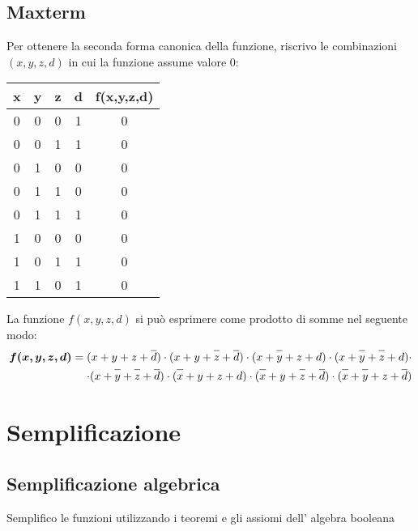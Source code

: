 \documentclass{article}
\newcommand*{\oline}[1]{\overline{#1\mathstrut}}
\newcommand{\bigspace}{\quad\quad\quad\quad}
\begin{document}
\subsection*{Maxterm}
Per ottenere la seconda forma canonica della funzione, riscrivo le combinazioni $(x,y,z,d)$ in cui la funzione assume valore $0$:
\begin{center}
	\begin{tabular}{|c|c|c|c|c|}
		\hline
		\textbf{x} & \textbf{y} & \textbf{z} & \textbf{d} & \textbf{f(x,y,z,d)} \\
		\hline
		0 & 0 & 0 & 1 & 0 \\
		\hline
		0 & 0 & 1 & 1 & 0 \\
		\hline
		0 & 1 & 0 & 0 & 0 \\
		\hline
		0 & 1 & 1 & 0 & 0 \\
		\hline
		0 & 1 & 1 & 1 & 0 \\
		\hline
		1 & 0 & 0 & 0 & 0 \\
		\hline
		1 & 0 & 1 & 1 & 0 \\
		\hline
		1 & 1 & 0 & 1 & 0 \\
		\hline
	\end{tabular}
\end{center}
La funzione $f(x,y,z,d)$ si può esprimere come prodotto di somme nel seguente modo:
\begin{align*}
\bm{f(x,y,z,d)} = (x+y+z+\oline{d}) \cdot (x+y+\oline{z}+\oline{d}) \cdot (x+\oline{y}+z+d) \cdot (x+\oline{y}+\oline{z}+d) \cdot \\ \cdot (x+\oline{y}+\oline{z}+\oline{d}) \cdot (\oline{x}+y+z+d) \cdot (\oline{x}+y+\oline{z}+\oline{d}) \cdot (\oline{x}+\oline{y}+z+\oline{d})
\end{align*}
\newpage
\section{Semplificazione}
\subsection*{Semplificazione algebrica}
Semplifico le funzioni utilizzando i teoremi e gli assiomi dell' algebra booleana
\bigspace
\end{document}
